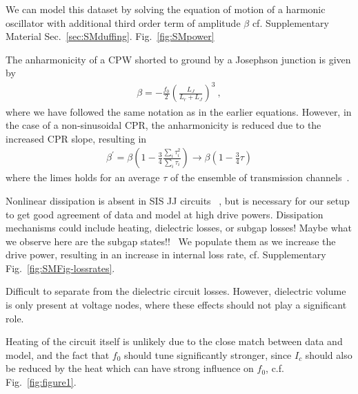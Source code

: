 We can model this dataset by solving the equation of motion of a harmonic oscillator with additional third order term of amplitude $\beta$ cf. Supplementary Material Sec.~\ref{sec:SMduffing}.
%
Fig.~\ref{fig:SMpower}

The anharmonicity of a CPW shorted to ground by a Josephson junction is given by~\cite{wilsonPhotonGenerationElectromagnetic2010b,zhouHighgainWeaklyNonlinear2014}
\begin{align}
\beta=-\frac{f_0}{2} \left(\frac{L_J}{L_r+L_J}\right)^3\ ,
\label{eq:anharmonicity}
\end{align}
%
where we have followed the same notation as in the earlier equations.
%
However, in the case of a non-sinusoidal CPR, the anharmonicity is reduced due to the increased CPR slope, resulting in
\begin{align}
\beta^\prime = \beta \left( 1-\frac{3}{4}\frac{\sum_i\tau_i^2}{\sum_i\tau_i}\right) \rightarrow \beta \left( 1-\frac{3}{4}\tau \right)
\label{eq:anh_nonsin}
\end{align}
%
where the limes holds for an average $\tau$ of the ensemble of transmission channels~\cite{kringhojAnharmonicitySuperconductingQubit2018}.

Nonlinear dissipation is absent in SIS JJ circuits ~\cite{boakninDispersiveMicrowaveBifurcation2007b}, but is necessary for our setup to get good agreement of data and model at high drive powers.
%
Dissipation mechanisms could include heating, dielectric losses, or subgap losses!
%
Maybe what we observe here are the subgap states!!~\cite{fuechsleEffectMicrowavesCurrentPhase2009,dassonnevilleDissipationSupercurrentFluctuations2013}
%
We populate them as we increase the drive power, resulting in an increase in internal loss rate, cf. Supplementary Fig.~\ref{fig:SMFig-lossrates}.

Difficult to separate from the dielectric circuit losses.
%
However, dielectric volume is only present at voltage nodes, where these effects should not play a significant role.

Heating of the circuit itself is unlikely due to the close match between data and model, and the fact that $f_0$ should tune significantly stronger, since $I_c$ should also be reduced by the heat which can have strong influence on $f_0$, c.f. Fig.~\ref{fig:figure1}.



